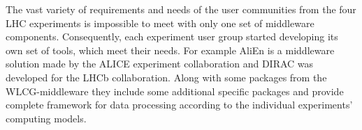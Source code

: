 The vast variety of requirements and needs of the user communities from the four LHC experiments is impossible to meet with only one set of middleware components. Consequently, each experiment user group started developing its own set of tools, which meet their needs. For example AliEn is a middleware solution made by the ALICE experiment collaboration and DIRAC was developed for the LHCb collaboration. Along with some packages from the WLCG-middleware they include some additional specific packages and provide complete framework for data processing according to the individual experiments' computing models.


